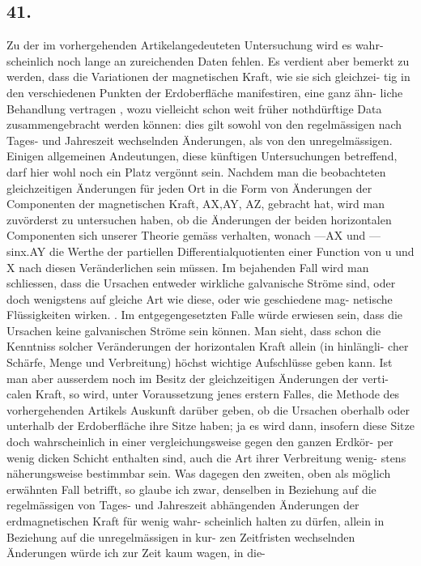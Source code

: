 \documentclass[12pt,a4paper]{article}
\begin{document}
\subsection*{41.}
Zu der im vorhergehenden Artikelangedeuteten Untersuchung wird es wahr- scheinlich noch lange an zureichenden Daten fehlen. Es verdient aber bemerkt zu werden, dass die Variationen der magnetischen Kraft, wie sie sich gleichzei- tig in den verschiedenen Punkten der Erdoberfläche manifestiren, eine ganz ähn- liche Behandlung vertragen , wozu vielleicht schon weit früher nothdürftige Data zusammengebracht werden können: dies gilt sowohl von den regelmässigen nach Tages- und Jahreszeit wechselnden Änderungen, als von den unregelmässigen. Einigen allgemeinen Andeutungen, diese künftigen Untersuchungen betreffend, darf hier wohl noch ein Platz vergönnt sein. Nachdem man die beobachteten gleichzeitigen Änderungen für jeden Ort in die Form von Änderungen der Componenten der magnetischen Kraft, AX,AY, AZ, gebracht hat, wird man zuvörderst zu untersuchen haben, ob die Änderungen der beiden horizontalen Componenten sich unserer Theorie gemäss verhalten, wonach ---AX und ---sinx.AY die Werthe der partiellen Differentialquotienten einer Function von u und X nach diesen Veränderlichen sein müssen. Im bejahenden Fall wird man schliessen, dass die Ursachen entweder wirkliche galvanische Ströme sind, oder doch wenigstens auf gleiche Art wie diese, oder wie geschiedene mag- netische Flüssigkeiten wirken. . Im entgegengesetzten Falle würde erwiesen sein, dass die Ursachen keine galvanischen Ströme sein können. Man sieht, dass schon die Kenntniss solcher Veränderungen der horizontalen Kraft allein (in hinlängli- cher Schärfe, Menge und Verbreitung) höchst wichtige Aufschlüsse geben kann. Ist man aber ausserdem noch im Besitz der gleichzeitigen Änderungen der verti- calen Kraft, so wird, unter Voraussetzung jenes erstern Falles, die Methode des vorhergehenden Artikels Auskunft darüber geben, ob die Ursachen oberhalb oder unterhalb der Erdoberfläche ihre Sitze haben; ja es wird dann, insofern diese Sitze doch wahrscheinlich in einer vergleichungsweise gegen den ganzen Erdkör- per wenig dicken Schicht enthalten sind, auch die Art ihrer Verbreitung wenig- stens näherungsweise bestimmbar sein. Was dagegen den zweiten, oben als möglich erwähnten Fall betrifft, so glaube ich zwar, denselben in Beziehung auf die regelmässigen von Tages- und Jahreszeit abhängenden Änderungen der erdmagnetischen Kraft für wenig wahr- scheinlich halten zu dürfen, allein in Beziehung auf die unregelmässigen in kur- zen Zeitfristen wechselnden Änderungen würde ich zur Zeit kaum wagen, in die-
\end{document}
